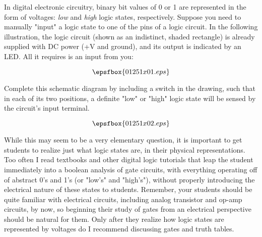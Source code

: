 

In digital electronic circuitry, binary bit values of 0 or 1 are represented in the form of voltages: {\it low} and {\it high} logic states, respectively.  Suppose you need to manually "input" a logic state to one of the pins of a logic circuit.  In the following illustration, the logic circuit (shown as an indistinct, shaded rectangle) is already supplied with DC power (+V and ground), and its output is indicated by an LED.  All it requires is an input from you:

$$\epsfbox{01251x01.eps}$$

Complete this schematic diagram by including a switch in the drawing, such that in each of its two positions, a definite "low" or "high" logic state will be sensed by the circuit's input terminal.







$$\epsfbox{01251x02.eps}$$







While this may seem to be a very elementary question, it is important to get students to realize just what logic states are, in their physical representations.  Too often I read textbooks and other digital logic tutorials that leap the student immediately into a boolean analysis of gate circuits, with everything operating off of abstract 0's and 1's (or "low's" and "high's"), without properly introducing the electrical nature of these states to students.  Remember, your students should be quite familiar with electrical circuits, including analog transistor and op-amp circuits, by now, so beginning their study of gates from an electrical perspective should be natural for them.  Only after they realize how logic states are represented by voltages do I recommend discussing gates and truth tables.




